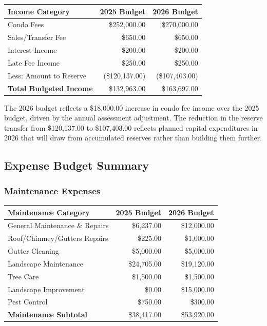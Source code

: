 \documentclass[11pt]{article}
\newcommand{\strong}[1]{\textbf{#1}}
\newcommand{\money}[1]{\$#1}
\begin{document}
\begin{center}
\begin{tabular}{@{}lrr@{}}
\toprule
\textbf{Income Category} & \textbf{2025 Budget} & \textbf{2026 Budget} \\
\midrule
Condo Fees & \money{252{,}000.00} & \money{270{,}000.00} \\
Sales/Transfer Fee & \money{650.00} & \money{650.00} \\
Interest Income & \money{200.00} & \money{200.00} \\
Late Fee Income & \money{250.00} & \money{250.00} \\
Less: Amount to Reserve & (\money{120{,}137.00}) & (\money{107{,}403.00}) \\
\midrule
\strong{Total Budgeted Income} & \money{132{,}963.00} & \money{163{,}697.00} \\
\bottomrule
\end{tabular}
\end{center}

\noindent
The 2026 budget reflects a \money{18{,}000.00} increase in condo fee income over the 2025
budget, driven by the annual assessment adjustment. The reduction in the reserve transfer
from \money{120{,}137.00} to \money{107{,}403.00} reflects planned capital expenditures in
2026 that will draw from accumulated reserves rather than building them further.

\subsection{Expense Budget Summary}

\subsubsection*{Maintenance Expenses}
\vspace{-0.6em}

\begin{center}
\begin{tabular}{@{}lrr@{}}
\toprule
\textbf{Maintenance Category} & \textbf{2025 Budget} & \textbf{2026 Budget} \\
\midrule
General Maintenance \& Repairs & \money{6{,}237.00} & \money{12{,}000.00} \\
Roof/Chimney/Gutters Repairs & \money{225.00} & \money{1{,}000.00} \\
Gutter Cleaning & \money{5{,}000.00} & \money{5{,}000.00} \\
Landscape Maintenance & \money{24{,}705.00} & \money{19{,}120.00} \\
Tree Care & \money{1{,}500.00} & \money{1{,}500.00} \\
Landscape Improvement & \money{0.00} & \money{15{,}000.00} \\
Pest Control & \money{750.00} & \money{300.00} \\
\midrule
\strong{Maintenance Subtotal} & \money{38{,}417.00} & \money{53{,}920.00} \\
\bottomrule
\end{tabular}
\end{center}
\end{document}
